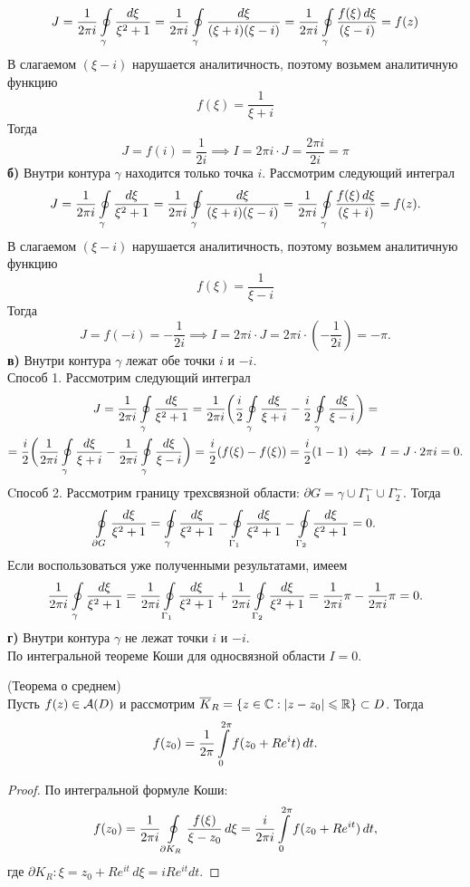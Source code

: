 	\[ J = \frac{1}{2\pi i} \oint\limits_\gamma \frac{d\xi}{\xi^2 + 1} = \frac{1}{2\pi i} \oint\limits_\gamma \frac{d\xi}{(\xi + i)(\xi - i)} = \frac{1}{2\pi i} \oint\limits_\gamma \frac{f(\xi)\,d\xi}{(\xi - i)} = f(z) \]
	В слагаемом \((\xi - i)\) нарушается аналитичность, поэтому возьмем аналитичную функцию
	\[ f(\xi) = \frac{1}{\xi + i} \]
	Тогда
	\[ 	J = f(i) = \frac{1}{2i} \implies I = 2\pi i\cdot J= \frac{2\pi i}{2i} = \pi \]
	\textbf{б)} Внутри контура $\gamma$ находится только точка $i$. Рассмотрим следующий интеграл
	\[ J = \frac{1}{2\pi i} \oint\limits_\gamma \frac{d\xi}{\xi^2 + 1} = \frac{1}{2\pi i} \oint\limits_\gamma \frac{d\xi}{(\xi + i)(\xi - i)} = \frac{1}{2\pi i} \oint\limits_\gamma \frac{f(\xi)\,d\xi}{(\xi + i)} = f(z). \]
	В слагаемом $(\xi - i)$ нарушается аналитичность, поэтому возьмем аналитичную функцию
	\[ f(\xi) = \frac{1}{\xi - i} \]
	Тогда
	\[ J = f(-i) = -\frac{1}{2i} \implies I = 2\pi i \cdot J = 2\pi i \cdot \left(-\frac{1}{2i}\right) = -\pi. \]
	\textbf{в)} Внутри контура $\gamma$ лежат обе точки $i$ и $-i$.\\
	Способ 1. Рассмотрим следующий интеграл
	\begin{multline*}
		J = \frac{1}{2\pi i} \Oint_\gamma \frac{d\xi}{\xi^2 + 1} = \frac{1}{2\pi i} \bigg(\frac{i}{2} \Oint_\gamma\frac{d\xi}{\xi + i} - \frac{i}{2}\Oint_\gamma \frac{d\xi}{\xi - i} \bigg)=\\= \frac{i}{2} \bigg(\frac{1}{2\pi i} \Oint_\gamma \frac{d\xi}{\xi + i} - \frac{1}{2\pi i}\Oint_\gamma\frac{d\xi}{\xi - i}\bigg) = \frac{i}{2}(f(\xi) - f(\xi)) = \frac{i}{2}(1 - 1)\iff I = J\cdot2\pi i = 0.
	\end{multline*}
	Cпособ 2. Рассмотрим границу трехсвязной области: $\partial G = \gamma\cup\Gamma_1^- \cup \Gamma_2^-$. Тогда
	\[ \oint\limits_{\partial G} \frac{d\xi}{\xi^2 + 1} =\oint\limits_{\gamma}\frac{d\xi}{\xi^2 + 1} - \oint\limits_{\Gamma_1}\frac{d\xi}{\xi^2 + 1} - \oint\limits_{\Gamma_2}\frac{d\xi}{\xi^2 + 1} = 0. \]
	Если воспользоваться уже полученными результатами, имеем 
	\[ \frac{1}{2\pi i}\oint\limits_\gamma\frac{d\xi}{\xi^2 + 1} 
	= \frac{1}{2\pi i}\oint\limits_{\Gamma_1}\frac{d\xi}{\xi^2 + 1} + \frac{1}{2\pi i} \oint\limits_{\Gamma_2}\frac{d\xi}{\xi^2 + 1} = \frac{1}{2\pi i}\pi - \frac{1}{2\pi i}\pi = 0. \]
	\textbf{г)} Внутри контура $\gamma$ не лежат точки $i$ и $-i$.\\
	По интегральной теореме Коши для односвязной области $I = 0$.
	\begin{theorem*}
		(Теорема о среднем) \\
		\indent Пусть $f(z)\in\mathcal{A}(D)$ и рассмотрим $\overline K_R =\{z \in \mathbb{C}: |z - z_0|\leqslant\mathbb{R} \} \subset D$. Тогда
		\[ f(z_0) = \frac{1}{2\pi}\int\limits_0^{2\pi}f(z_0 + Re^it)\,dt. \]
	\end{theorem*}
	\begin{proof}
		По интегральной формуле Коши:
		\[ f(z_0) = \frac{1}{2\pi i}\oint\limits_{\partial K_R}\frac{f(\xi)}{\xi - z_0}\,d\xi = \frac{i}{2\pi i} \int\limits_0^{2\pi} f(z_0 + Re^{it})\,dt, \]
		где $\partial K_R: \xi = z_0 + Re^{it}\,d\xi = iRe^{it}dt$.
	\end{proof}
	\newpage

